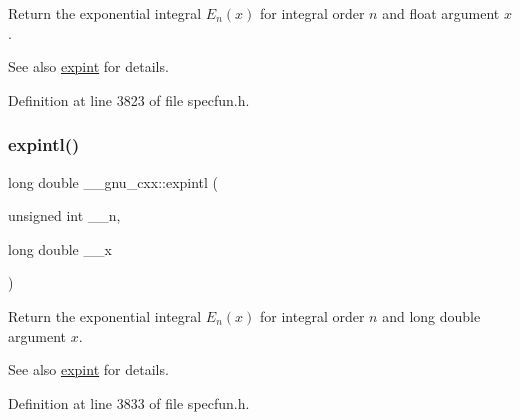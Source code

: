 Return the exponential integral $ E_n(x) $ for integral order $ n $ and {\ttfamily float} argument $ x $.

\begin{DoxySeeAlso}{See also}
\hyperlink{group__gnu__math__spec__func_gadaf9317953b826975da72d1858f01ea5}{expint} for details. 
\end{DoxySeeAlso}


Definition at line 3823 of file specfun.\+h.

\mbox{\label{group__gnu__math__spec__func_ga720ca0b275784c8b82193f427a2b3553}} 
\subsubsection{\texorpdfstring{expintl()}{expintl()}}
{\footnotesize\ttfamily long double \+\_\+\+\_\+gnu\+\_\+cxx\+::expintl (\begin{DoxyParamCaption}\item[{unsigned int}]{\+\_\+\+\_\+n,  }\item[{long double}]{\+\_\+\+\_\+x }\end{DoxyParamCaption})\hspace{0.3cm}{\ttfamily [inline]}}

Return the exponential integral $ E_n(x) $ for integral order $ n $ and {\ttfamily long double} argument $ x $.

\begin{DoxySeeAlso}{See also}
\hyperlink{group__gnu__math__spec__func_gadaf9317953b826975da72d1858f01ea5}{expint} for details. 
\end{DoxySeeAlso}


Definition at line 3833 of file specfun.\+h.

\mbox{\label{group__gnu__math__spec__func_gaa546f47f8ab943d2c10b56bec8a44079}} 
